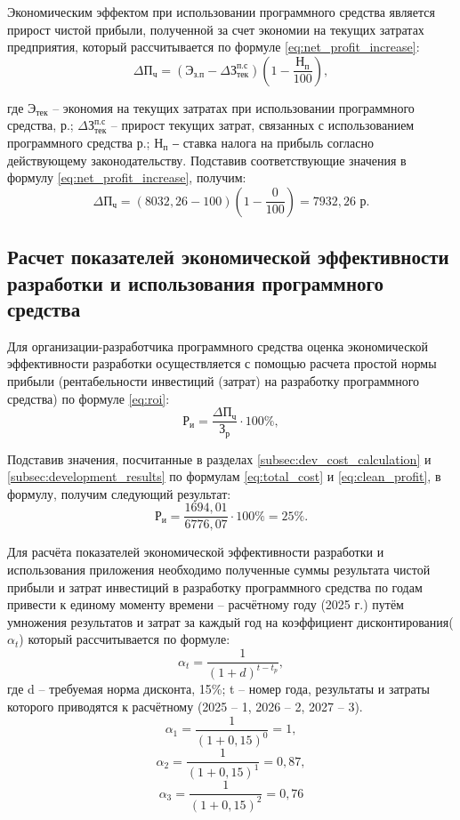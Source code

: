 Экономическим эффектом при использовании программного средства является прирост чистой прибыли, полученной за счет экономии на текущих затратах предприятия, который рассчитывается по формуле \ref{eq:net_profit_increase}:
\begin{equation}
	\label{eq:net_profit_increase}
	\Delta \mathrm{П_{ч}} = (\mathrm{Э_{з.п}} - \Delta \text{З}_\text{тек}^{\text{п.с}}) \left( 1 - \frac{\mathrm{Н_{п}}}{100} \right),
\end{equation}

где $\mathrm{Э_{тек}}$ – экономия на текущих затратах при использовании программного средства, р.; $\Delta \text{З}_\text{тек}^{\text{п.с}}$ – прирост текущих затрат, связанных с использованием программного средства р.; $\mathrm{Н_{п}}$ ‒ ставка налога на прибыль согласно действующему законодательству. Подставив соответствующие значения в формулу \ref{eq:net_profit_increase}, получим:
\[
\Delta \mathrm{П_{ч}} = (8032{,}26 - 100) \left(1 - \frac{0}{100}\right) = 7932{,}26 \text{ р}.
\]

\subsection{Расчет показателей экономической эффективности разработки и использования программного средства} 

Для организации-разработчика программного средства оценка экономической эффективности разработки осуществляется с помощью расчета простой нормы прибыли (рентабельности инвестиций (затрат) на разработку программного средства) по формуле \ref{eq:roi}:
\begin{equation}
	\label{eq:roi}
	\mathrm{Р_{и}} = \frac{\Delta \mathrm{П_{ч}}}{\mathrm{З_{р}}} \cdot 100\%,
\end{equation}

Подставив значения, посчитанные в разделах \ref{subsec:dev_cost_calculation} и \ref{subsec:development_results}   по формулам \ref{eq:total_cost} и \ref{eq:clean_profit}, в формулу, получим следующий результат:
\[
\mathrm{Р_{и}} = \frac{1694{,}01}{6776{,}07} \cdot 100\% = 25\%.
\]

Для расчёта показателей экономической эффективности разработки и использования приложения необходимо полученные суммы результата чистой прибыли и затрат инвестиций в разработку программного средства по годам привести к единому моменту времени – расчётному году (2025 г.) путём умножения результатов и затрат за каждый год на коэффициент дисконтирования($\alpha_t$) который рассчитывается по формуле:
\begin{equation}
	\alpha_t = \frac{1}{(1 + d)^{t - t_p}},
\end{equation}
где d – требуемая норма дисконта, 15\%;
t – номер года, результаты и затраты которого приводятся к расчётному (2025 – 1, 2026 – 2, 2027 – 3).
\[
\alpha_1 = \frac{1}{(1+0{,}15)^0} = 1,
\]
\[
\alpha_2 = \frac{1}{(1+0{,}15)^1} = 0{,}87,
\]
\[
\alpha_3 = \frac{1}{(1+0{,}15)^2} = 0{,}76
\]

